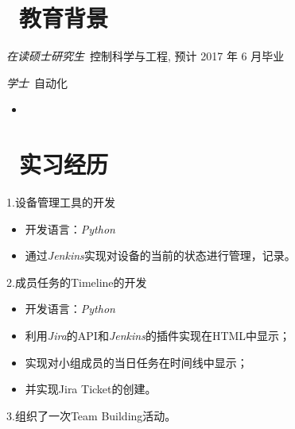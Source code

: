 \documentclass{resume}
\begin{document}



\section{\faGraduationCap\  教育背景}
\textit{在读硕士研究生}\ 控制科学与工程, 预计 2017 年 6 月毕业

\textit{学士}\ 自动化
\begin{itemize}
\item {}

\end{itemize}

\section{\faUsers\ 实习经历}
1.设备管理工具的开发
\begin{itemize}
  \item 开发语言：\emph{Python}
  \item 通过\emph{Jenkins}实现对设备的当前的状态进行管理，记录。
  \\
\end{itemize}
2.成员任务的Timeline的开发
\begin{itemize}
  \item 开发语言：\emph{Python}
  \item 利用\emph{Jira}的API和\emph{Jenkins}的插件实现在HTML中显示；
  \item 实现对小组成员的当日任务在时间线中显示；
  \item 并实现Jira Ticket的创建。
  \\
\end{itemize}

3.组织了一次Team Building活动。
 


\end{document}
